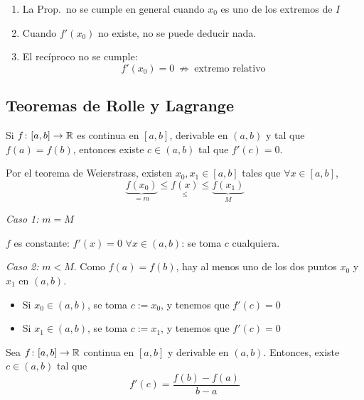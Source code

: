 \documentclass[11pt,a4paper]{article}
\begin{document}
\begin{observacion}
  \begin{enumerate}[label=(\arabic*)]
    \item La Prop.\ no se cumple en general cuando $x_0$ es uno de los
      extremos de $I$
    \item Cuando $f'(x_0)$ no existe, no se puede deducir nada.
    \item El recíproco no se cumple:
      \[
        f'(x_0)=0\ \not\Longrightarrow\ \text{extremo relativo}
      \]
  \end{enumerate}
\end{observacion}

\subsection{Teoremas de Rolle y Lagrange}

\begin{lema}[Rolle]
  Si $f\colon[a,b]\to\mathbb{R}$ es continua en $[a,b]$, derivable en $(a,b)$ y tal
  que $f(a)=f(b)$, entonces existe $c\in(a,b)$ tal que $f'(c)=0$.
\end{lema}

\begin{demo}
  Por el teorema de Weierstrass, existen $x_0,x_1\in[a,b]$ tales que
  $\forall x\in[a,b]$,
  \[
    \underbrace{f(x_0)}_{=m}\leq \underset{\textstyle\leq}{f(x)}
    \leq\underbrace{f(x_1)}_{M}
  \]

  \textit{Caso 1:} $m=M$

  $f$ es constante: $f'(x)=0$ $\forall x\in(a,b)$: se toma $c$ cualquiera.

  \textit{Caso 2:} $m<M$. Como $f(a)=f(b)$, hay al menos uno de los dos
  puntos $x_0$ y $x_1$ en $(a,b)$.
  \begin{itemize}
    \item[--] Si $x_0\in(a,b)$, se toma $c:=x_0$, y tenemos que $f'(c)=0$
    \item[--] Si $x_1\in(a,b)$, se toma $c:=x_1$, y
      tenemos que $f'(c)=0$
  \end{itemize}
\end{demo}

\begin{teorema}
  Sea $f\colon[a,b]\to\mathbb{R}$ continua en $[a,b]$ y derivable en $(a,b)$.
  Entonces, existe $c\in(a,b)$ tal que
  \[
    f'(c)=\frac{f(b)-f(a)}{b-a}
  \]
\end{teorema}
\end{document}
